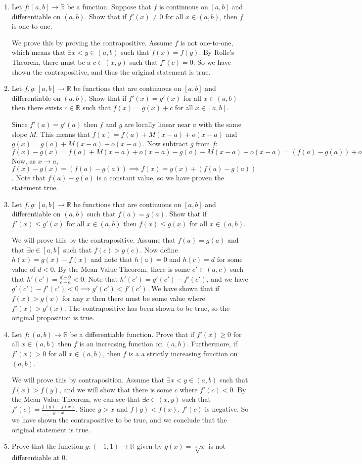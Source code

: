 \documentclass[11pt]{article}
\newcommand{\R}{\mathbb{R}}
\begin{document}
\begin{enumerate}
\item{Let $f:[a,b]\to\R$ be a function. Suppose that $f$ is continuous on
$[a,b]$ and differentiable on $(a,b)$. Show that if $f'(x)\neq0$ for all
$x\in(a,b)$, then $f$ is one-to-one.}

We prove this by proving the contrapositive. Assume $f$ is not one-to-one,
which means that $\exists x<y\in(a,b)$ such that $f(x)=f(y)$.
By Rolle's Theorem, there must be a $c\in(x,y)$ such that $f'(c)=0$.
So we have shown the contrapositive, and thus the original statement
is true.

\item{Let $f,g:[a,b]\to\R$ be functions that are continuous on $[a,b]$ and
differentiable on $(a,b)$. Show that if $f'(x)=g'(x)$ for all $x\in(a,b)$
then there exists $c\in\R$ such that $f(x)=g(x)+c$ for all $x\in[a,b]$.}

Since $f'(a)=g'(a)$ then $f$ and $g$ are locally linear near $a$ with the
same slope $M$. This means that $f(x)=f(a)+M(x-a)+o(x-a)$ and
$g(x)=g(a)+M(x-a)+o(x-a)$. Now subtract $g$ from $f$:
$f(x)-g(x)=f(a)+M(x-a)+o(x-a)-g(a)-M(x-a)-o(x-a)=
(f(a)-g(a))+o(x-a)-o(x-a)$ Now, as $x\to a$,
$f(x)-g(x)=(f(a)-g(a))\implies f(x)=g(x)+(f(a)-g(a))$. Note that
$f(a)-g(a)$ is a constant value, so we have proven the statement true.

\item{Let $f,g:[a,b]\to\R$ be functions that are continuous on $[a,b]$
and differentiable on $(a,b)$ such that $f(a)=g(a)$. Show that if
$f'(x)\leq g'(x)$ for all $x\in(a,b)$ then $f(x)\leq g(x)$ for all
$x\in(a,b)$.}

We will prove this by the contrapositive. Assume that $f(a)=g(a)$ and that
$\exists c\in[a,b]$ such that $f(c)>g(c)$. Now define $h(x)=g(x)-f(x)$
and note that $h(a)=0$ and $h(c)=d$ for some value of $d<0$. 
By the Mean Value Theorem, there is some $c'\in(a,c)$ such that
$h'(c')=\frac{d-0}{c-a}<0$. Note that $h'(c')=g'(c')-f'(c')$, and we have
$g'(c')-f'(c')<0\implies g'(c')<f'(c')$. We have shown that if
$f(x)>g(x)$ for any $x$ then there must be some value where
$f'(x)>g'(x)$. The contrapositive has been shown to be true, so the original
proposition is true.


\setcounter{enumi}{7}
\item{Let $f:(a,b)\to\R$ be a differentiable function. Prove that if
$f'(x)\geq 0$ for all $x\in(a,b)$ then $f$ is an increasing function on
$(a,b)$. Furthermore, if $f'(x)>0$ for all $x\in(a,b)$, then $f$ is a
a strictly increasing function on $(a,b)$.}

We will prove this by contraposition. Assume that $\exists x<y\in(a,b)$
such that $f(x)>f(y)$, and we will show that there is some $c$ where
$f'(c)<0$. By the Mean Value Theorem, we can see that $\exists c\in(x,y)$
such that $f'(c)=\frac{f(y)-f(x)}{y-x}$. Since $y>x$ and $f(y)<f(x)$,
$f'(c)$ is negative. So we have shown the contrapositive to be true,
and we conclude that the original statement is true.

\item{Prove that the function $g:(-1,1)\to\R$ given by $g(x)=\sqrt[3]{x}$
is not differentiable at 0.}

\end{enumerate}
\end{document}
